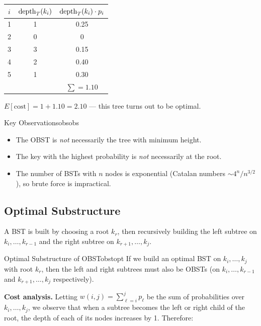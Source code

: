 \begin{center}
\renewcommand{\arraystretch}{1.2}
\begin{tabular}{ccc}
\toprule
$i$ & $\operatorname{depth}_T(k_i)$ & $\operatorname{depth}_T(k_i) \cdot p_i$ \\
\midrule
1 & 1 & 0.25 \\
2 & 0 & 0    \\
3 & 3 & 0.15 \\
4 & 2 & 0.40 \\
5 & 1 & 0.30 \\
\midrule
  &   & $\sum = 1.10$ \\
\bottomrule
\end{tabular}
\end{center}

$E[\text{cost}] = 1 + 1.10 = \mathbf{2.10}$ — this tree turns out to be optimal.

\begin{remark}{Key Observations}{obsobs}
\begin{itemize}[noitemsep]
  \item The OBST is \emph{not} necessarily the tree with minimum height.
  \item The key with the highest probability is \emph{not} necessarily at the root.
  \item The number of BSTs with $n$ nodes is exponential (Catalan numbers $\sim 4^n/n^{3/2}$),
        so brute force is impractical.
\end{itemize}
\end{remark}

\subsection{Optimal Substructure}

A BST is built by choosing a root $k_r$, then recursively building the left
subtree on $k_i, \ldots, k_{r-1}$ and the right subtree on $k_{r+1}, \ldots, k_j$.

\begin{theorem}{Optimal Substructure of OBST}{obstopt}
If we build an optimal BST on $k_i, \ldots, k_j$ with root $k_r$, then the
left and right subtrees must also be OBSTs (on $k_i, \ldots, k_{r-1}$ and
$k_{r+1}, \ldots, k_j$ respectively).
\end{theorem}

\textbf{Cost analysis.} Letting $w(i,j) = \sum_{\ell=i}^{j} p_\ell$ be the sum
of probabilities over $k_i, \ldots, k_j$, we observe that when a subtree becomes
the left or right child of the root, the depth of each of its nodes increases by 1.
Therefore:

